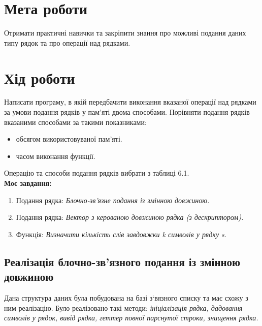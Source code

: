 \section{Мета роботи}
Отримати практичні навички та закріпити знання про можливі
подання даних типу рядок та про операції над рядками.

\section{Хід роботи}
Написати програму, в якій передбачити виконання вказаної операції над рядками за умови подання рядків у пам’яті двома способами. 
Порівняти подання рядків вказаними способами за такими показниками:

\begin{itemize}
  \item обсягом використовуваної пам’яті.
	\item часом виконання функції.
\end{itemize}

Операцію та способи подання рядків вибрати з таблиці 6.1.\\

\textbf{Моє завдання:}
\begin{enumerate}
  \item Подання рядка: \textit{Блочно-зв’язне подання із змінною довжиною.}
  \item Подання рядка: \textit{Вектор з керованою довжиною рядка (з дескриптором).}
	\item Функція: \textit{Визначити кількість слів завдовжки k символів у рядку s.}
\end{enumerate}

\clearpage
\subsection{Реалізація блочно-зв’язного подання із змінною довжиною}
Дана структура даних була побудована на базі з`вязного списку та має схожу з ним реалізацію.
	Було реалізовано такі методи: \textit{ініціалізація рядка, дадовання символів у рядок, 
вивід рядка, геттер повної парснутої строки, знищення рядка.}

